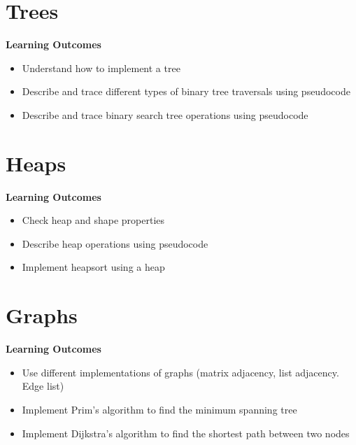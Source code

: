 \subsection{}



\section{Trees}
\begin{mdframed}
    \textbf{Learning Outcomes}
    \begin{itemize}[label={\checkmark}]
        \item Understand how to implement a tree
        \item Describe and trace different types of binary tree traversals using pseudocode
        \item Describe and trace binary search tree operations using pseudocode
    \end{itemize}
\end{mdframed}

\subsection{}



\section{Heaps}
\begin{mdframed}
    \textbf{Learning Outcomes}
    \begin{itemize}[label={\checkmark}]
        \item Check heap and shape properties
        \item Describe heap operations using pseudocode
        \item Implement heapsort using a heap
    \end{itemize}
\end{mdframed}

\subsection{}




\section{Graphs}
\begin{mdframed}
    \textbf{Learning Outcomes}
    \begin{itemize}[label={\checkmark}]
        \item Use different implementations of graphs (matrix adjacency, list adjacency. Edge list)
        \item Implement Prim’s algorithm to find the minimum spanning tree
        \item Implement Dijkstra’s algorithm to find the shortest path between two nodes
    \end{itemize}
\end{mdframed}

\subsection{}





